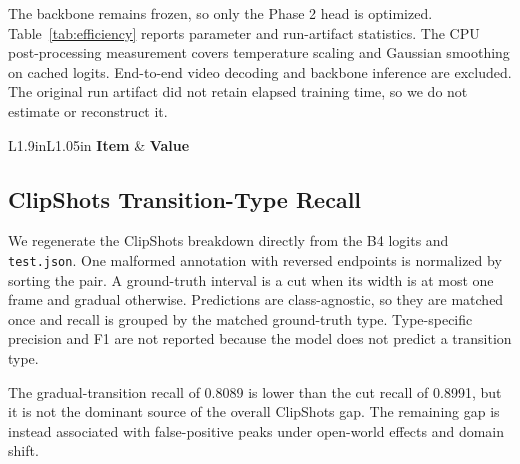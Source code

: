 The backbone remains frozen, so only the Phase 2 head is optimized.
Table~\ref{tab:efficiency} reports parameter and run-artifact statistics.
The CPU post-processing measurement covers temperature scaling and Gaussian
smoothing on cached logits. End-to-end video decoding and backbone inference
are excluded. The original run artifact did not retain elapsed training time,
so we do not estimate or reconstruct it.

\begin{table}[!t]
\caption{Efficiency and Run-Artifact Statistics}
\label{tab:efficiency}
\centering
\small
\renewcommand{\arraystretch}{1.06}
\begin{tabular}{L{1.9in}L{1.05in}}
\toprule
\textbf{Item} & \textbf{Value} \\
\midrule
\PaperEfficiencyRows
\bottomrule
\end{tabular}
\end{table}

\subsection{ClipShots Transition-Type Recall}

We regenerate the ClipShots breakdown directly from the B4 logits and
\texttt{test.json}. One malformed annotation with reversed endpoints is
normalized by sorting the pair. A ground-truth interval is a cut when its
width is at most one frame and gradual otherwise. Predictions are
class-agnostic, so they are matched once and recall is grouped by the matched
ground-truth type. Type-specific precision and F1 are not reported because the
model does not predict a transition type.

\begin{table}[!t]
\caption{ClipShots Recall by Ground-Truth Transition Type}
\label{tab:clipshots_breakdown}
\centering
\small
\renewcommand{\arraystretch}{1.08}
\end{table}

The gradual-transition recall of 0.8089 is lower than the cut recall of
0.8991, but it is not the dominant source of the overall ClipShots gap.
The remaining gap is instead associated with false-positive peaks under
open-world effects and domain shift.

